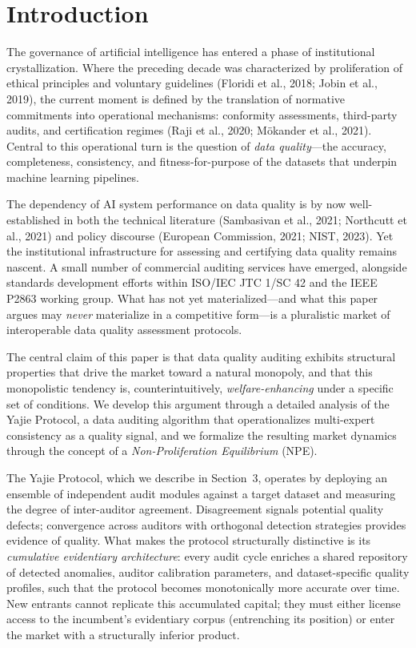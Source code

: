 \documentclass[12pt,a4paper]{ctexart}
\theoremstyle{definition}
\theoremstyle{remark}
\begin{document}
\section{Introduction}

The governance of artificial intelligence has entered a phase of institutional crystallization. Where the preceding decade was characterized by proliferation of ethical principles and voluntary guidelines (Floridi et al., 2018; Jobin et al., 2019), the current moment is defined by the translation of normative commitments into operational mechanisms: conformity assessments, third-party audits, and certification regimes (Raji et al., 2020; M\"{o}kander et al., 2021). Central to this operational turn is the question of \textit{data quality}—the accuracy, completeness, consistency, and fitness-for-purpose of the datasets that underpin machine learning pipelines.

The dependency of AI system performance on data quality is by now well-established in both the technical literature (Sambasivan et al., 2021; Northcutt et al., 2021) and policy discourse (European Commission, 2021; NIST, 2023). Yet the institutional infrastructure for assessing and certifying data quality remains nascent. A small number of commercial auditing services have emerged, alongside standards development efforts within ISO/IEC JTC 1/SC 42 and the IEEE P2863 working group. What has not yet materialized—and what this paper argues may \textit{never} materialize in a competitive form—is a pluralistic market of interoperable data quality assessment protocols.

The central claim of this paper is that data quality auditing exhibits structural properties that drive the market toward a natural monopoly, and that this monopolistic tendency is, counterintuitively, \textit{welfare-enhancing} under a specific set of conditions. We develop this argument through a detailed analysis of the Yajie Protocol, a data auditing algorithm that operationalizes multi-expert consistency as a quality signal, and we formalize the resulting market dynamics through the concept of a \textit{Non-Proliferation Equilibrium} (NPE).

The Yajie Protocol, which we describe in Section~3, operates by deploying an ensemble of independent audit modules against a target dataset and measuring the degree of inter-auditor agreement. Disagreement signals potential quality defects; convergence across auditors with orthogonal detection strategies provides evidence of quality. What makes the protocol structurally distinctive is its \textit{cumulative evidentiary architecture}: every audit cycle enriches a shared repository of detected anomalies, auditor calibration parameters, and dataset-specific quality profiles, such that the protocol becomes monotonically more accurate over time. New entrants cannot replicate this accumulated capital; they must either license access to the incumbent's evidentiary corpus (entrenching its position) or enter the market with a structurally inferior product.
\end{document}
